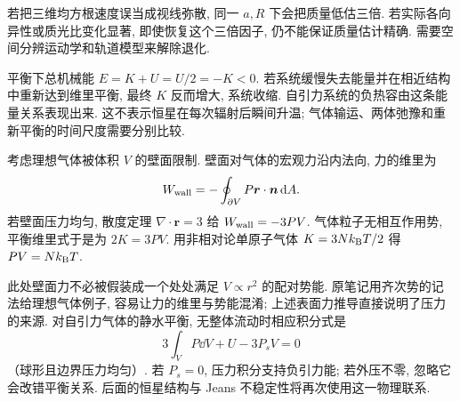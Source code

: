 \begin{example}
若把三维均方根速度误当成视线弥散, 同一 $a,R$ 下会把质量低估三倍. 若实际各向异性或质光比变化显著, 即使恢复这个三倍因子, 仍不能保证质量估计精确. 需要空间分辨运动学和轨道模型来解除退化.
\end{example}

平衡下总机械能 $E=K+U=U/2=-K<0$. 若系统缓慢失去能量并在相近结构中重新达到维里平衡, 最终 $K$ 反而增大, 系统收缩. 自引力系统的负热容由这条能量关系表现出来. 这不表示恒星在每次辐射后瞬间升温; 气体输运、两体弛豫和重新平衡的时间尺度需要分别比较.

考虑理想气体被体积 $V$ 的壁面限制. 壁面对气体的宏观力沿内法向, 力的维里为
\[
W_{\rm wall}=-\oint_{\partial V}P\boldsymbol r\cdot\boldsymbol n\,\mathrm d A.
\]
若壁面压力均匀, 散度定理 $\nabla\cdot\boldsymbol r=3$ 给 $W_{\rm wall}=-3PV$. 气体粒子无相互作用势, 平衡维里式于是为 $2K=3PV$. 用非相对论单原子气体 $K=3Nk_{\mathrm B} T/2$ 得 $PV=Nk_{\mathrm B} T$.

此处壁面力不必被假装成一个处处满足 $V\propto r^2$ 的配对势能. 原笔记用齐次势的记法给理想气体例子, 容易让力的维里与势能混淆; 上述表面力推导直接说明了压力的来源. 对自引力气体的静水平衡, 无整体流动时相应积分式是
\[
3\int_VP\dd V+U-3P_sV=0
\]
（球形且边界压力均匀）. 若 $P_s=0$, 压力积分支持负引力能; 若外压不零, 忽略它会改错平衡关系. 后面的恒星结构与 Jeans 不稳定性将再次使用这一物理联系.
